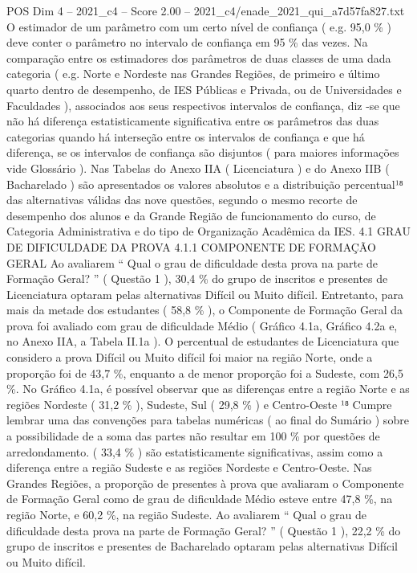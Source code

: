 \begin{textsample}{POS Dim 4 – 2021\_c4 – Score 2.00 – 2021\_c4/enade\_2021\_qui\_a7d57fa827.txt}
O estimador de um parâmetro com um certo nível de confiança ( e.g. 95,0 \% ) deve conter o parâmetro no intervalo de confiança em 95 \% das vezes.
Na comparação entre os estimadores dos parâmetros de duas classes de uma dada categoria ( e.g.
Norte e Nordeste nas Grandes Regiões, de primeiro e último quarto dentro de desempenho, de IES Públicas e Privada, ou de Universidades e Faculdades ), associados aos seus respectivos intervalos de confiança, diz -se que não há diferença estatisticamente significativa entre os parâmetros das duas categorias quando há interseção entre os intervalos de confiança e que há diferença, se os intervalos de confiança são disjuntos ( para maiores informações vide Glossário ).
Nas Tabelas do Anexo IIA ( Licenciatura ) e do Anexo IIB ( Bacharelado ) são apresentados os valores absolutos e a distribuição percentual¹⁸ das alternativas válidas das nove questões, segundo o mesmo recorte de desempenho dos alunos e da Grande Região de funcionamento do curso, de Categoria Administrativa e do tipo de Organização Acadêmica da IES. 4.1 GRAU DE DIFICULDADE DA PROVA 4.1.1 COMPONENTE DE FORMAÇÃO GERAL Ao avaliarem “ Qual o grau de dificuldade desta prova na parte de Formação Geral? ” ( Questão 1 ), 30,4 \% do grupo de inscritos e presentes de Licenciatura optaram pelas alternativas Difícil ou Muito difícil.
Entretanto, para mais da metade dos estudantes ( 58,8 \% ), o Componente de Formação Geral da prova foi avaliado com grau de dificuldade Médio ( Gráfico 4.1a, Gráfico 4.2a e, no Anexo IIA, a Tabela II.1a ).
O percentual de estudantes de Licenciatura que considero a prova Difícil ou Muito difícil foi maior na região Norte, onde a proporção foi de 43,7 \%, enquanto a de menor proporção foi a Sudeste, com 26,5 \%.
No Gráfico 4.1a, é possível observar que as diferenças entre a região Norte e as regiões Nordeste ( 31,2 \% ), Sudeste, Sul ( 29,8 \% ) e Centro-Oeste ¹⁸ Cumpre lembrar uma das convenções para tabelas numéricas ( ao final do Sumário ) sobre a possibilidade de a soma das partes não resultar em 100 \% por questões de arredondamento. ( 33,4 \% ) são estatisticamente significativas, assim como a diferença entre a região Sudeste e as regiões Nordeste e Centro-Oeste.
Nas Grandes Regiões, a proporção de presentes à prova que avaliaram o Componente de Formação Geral como de grau de dificuldade Médio esteve entre 47,8 \%, na região Norte, e 60,2 \%, na região Sudeste.
Ao avaliarem “ Qual o grau de dificuldade desta prova na parte de Formação Geral? ” ( Questão 1 ), 22,2 \% do grupo de inscritos e presentes de Bacharelado optaram pelas alternativas Difícil ou Muito difícil.

\end{textsample}
